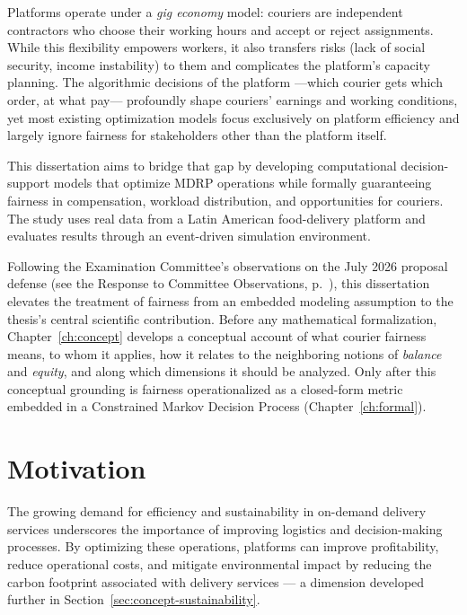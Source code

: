 \documentclass[12pt,a4paper]{report}
\begin{document}
Platforms operate under a \emph{gig economy} model: couriers are independent contractors who choose their working hours and accept or reject assignments. While this flexibility empowers workers, it also transfers risks (lack of social security, income instability) to them and complicates the platform's capacity planning. The algorithmic decisions of the platform ---which courier gets which order, at what pay--- profoundly shape couriers' earnings and working conditions, yet most existing optimization models focus exclusively on platform efficiency and largely ignore fairness for stakeholders other than the platform itself.

This dissertation aims to bridge that gap by developing computational decision-support models that optimize MDRP operations while formally guaranteeing fairness in compensation, workload distribution, and opportunities for couriers. The study uses real data from a Latin American food-delivery platform and evaluates results through an event-driven simulation environment.

Following the Examination Committee's observations on the July 2026 proposal defense (see the Response to Committee Observations, p.~\pageref{ch:response}), this dissertation elevates the treatment of fairness from an embedded modeling assumption to the thesis's central scientific contribution. Before any mathematical formalization, Chapter~\ref{ch:concept} develops a conceptual account of what courier fairness means, to whom it applies, how it relates to the neighboring notions of \emph{balance} and \emph{equity}, and along which dimensions it should be analyzed. Only after this conceptual grounding is fairness operationalized as a closed-form metric embedded in a Constrained Markov Decision Process (Chapter~\ref{ch:formal}).

\chapter{Motivation}
\label{ch:motivation}

The growing demand for efficiency and sustainability in on-demand delivery services underscores the importance of improving logistics and decision-making processes. By optimizing these operations, platforms can improve profitability, reduce operational costs, and mitigate environmental impact by reducing the carbon footprint associated with delivery services --- a dimension developed further in Section~\ref{sec:concept-sustainability}.
\end{document}
